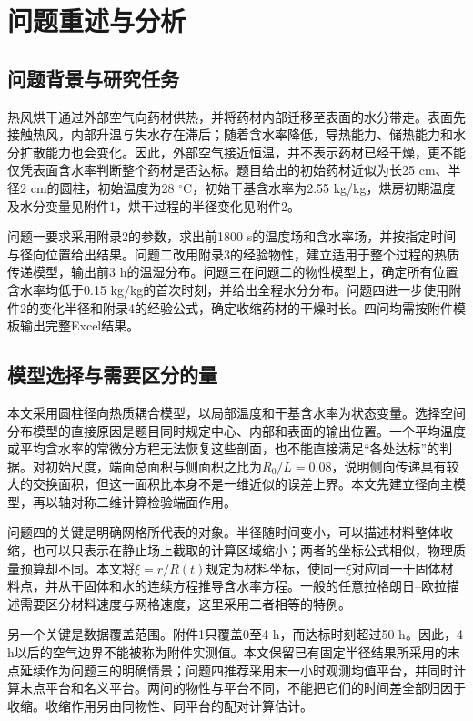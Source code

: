 \section{问题重述与分析}
\subsection{问题背景与研究任务}
热风烘干通过外部空气向药材供热，并将药材内部迁移至表面的水分带走。表面先接触热风，内部升温与失水存在滞后；随着含水率降低，导热能力、储热能力和水分扩散能力也会变化。因此，外部空气接近恒温，并不表示药材已经干燥，更不能仅凭表面含水率判断整个药材是否达标。题目给出的初始药材近似为长25 cm、半径2 cm的圆柱，初始温度为28 $^\circ$C，初始干基含水率为2.55 kg/kg，烘房初期温度及水分变量见附件1，烘干过程的半径变化见附件2。

问题一要求采用附录2的参数，求出前1800 s的温度场和含水率场，并按指定时间与径向位置给出结果。问题二改用附录3的经验物性，建立适用于整个过程的热质传递模型，输出前3 h的温湿分布。问题三在问题二的物性模型上，确定所有位置含水率均低于0.15 kg/kg的首次时刻，并给出全程水分分布。问题四进一步使用附件2的变化半径和附录4的经验公式，确定收缩药材的干燥时长。四问均需按附件模板输出完整Excel结果。

\subsection{模型选择与需要区分的量}
本文采用圆柱径向热质耦合模型，以局部温度和干基含水率为状态变量。选择空间分布模型的直接原因是题目同时规定中心、内部和表面的输出位置。一个平均温度或平均含水率的常微分方程无法恢复这些剖面，也不能直接满足“各处达标”的判据。对初始尺度，端面总面积与侧面积之比为$R_0/L=0.08$，说明侧向传递具有较大的交换面积，但这一面积比本身不是一维近似的误差上界。本文先建立径向主模型，再以轴对称二维计算检验端面作用。

问题四的关键是明确网格所代表的对象。半径随时间变小，可以描述材料整体收缩，也可以只表示在静止场上截取的计算区域缩小；两者的坐标公式相似，物理质量预算却不同。本文将$\xi=r/R(t)$规定为材料坐标，使同一$\xi$对应同一干固体材料点，并从干固体和水的连续方程推导含水率方程。一般的任意拉格朗日--欧拉描述需要区分材料速度与网格速度\cite{donea2004}，这里采用二者相等的特例。

另一个关键是数据覆盖范围。附件1只覆盖0至4 h，而达标时刻超过50 h。因此，4 h以后的空气边界不能被称为附件实测值。本文保留已有固定半径结果所采用的末点延续作为问题三的明确情景；问题四推荐采用末一小时观测均值平台，并同时计算末点平台和名义平台。两问的物性与平台不同，不能把它们的时间差全部归因于收缩。收缩作用另由同物性、同平台的配对计算估计。

